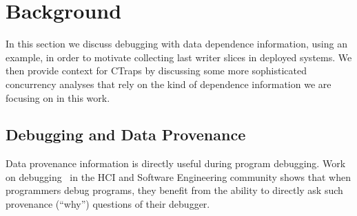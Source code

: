 \documentclass[preprint,9pt]{sigplanconf}
\newcommand{\ctraps}{CTraps\xspace}
\begin{document}


\section{Background}

In this section we discuss debugging with data dependence information, using an
example, in order to motivate collecting last writer slices in deployed
systems.  We then provide context for \ctraps by discussing some more
sophisticated concurrency analyses that rely on the kind of dependence
information we are focusing on in this work.


\subsection{Debugging and Data Provenance}

Data provenance information is directly useful during program debugging.
Work on debugging~\cite{whylinechi,whylineicse} in the HCI and Software
Engineering community shows that when programmers debug programs, they benefit
from the ability to directly ask such provenance (``why'') questions of their
debugger.  
\end{document}
